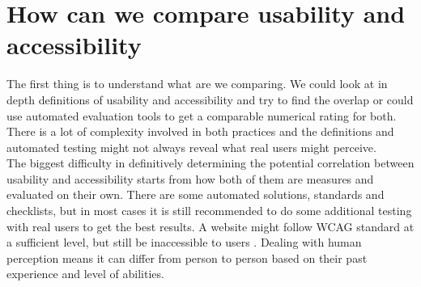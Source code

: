 \documentclass{thesis_proposal}
\begin{document}
\section{How can we compare usability and accessibility}
The first thing is to understand what are we comparing. We could look at in depth definitions of usability and accessibility and try to find the overlap or could use automated evaluation tools to get a comparable numerical rating for both. There is a lot of complexity involved in both practices and the definitions and automated testing might not always reveal what real users might perceive.\\
The biggest difficulty in definitively determining the potential correlation between usability and accessibility starts from how both of them are measures and evaluated on their own. There are some automated solutions, standards and checklists, but in most cases it is still recommended to do some additional testing with real users to get the best results. A website might follow  WCAG standard at a sufficient level, but still be inaccessible to users \citep{aizpurua_exploring_2016}. Dealing with human perception means it can differ from person to person based on their past experience and level of abilities.\\
\end{document}
